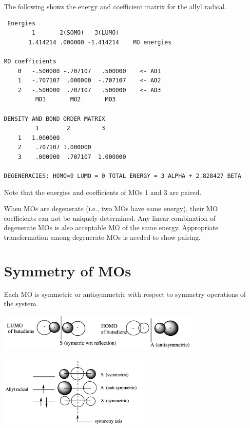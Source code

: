 \documentclass[../Main/chem532-notes.tex]{subfiles}
\begin{document}
\begin{example}
The following shows the energy and coefficient matrix for the allyl radical. 
\begin{verbatim}
 Energies
        1       2(SOMO)   3(LUMO) 
       1.414214 .000000 -1.414214    MO energies

MO coefficients
    0   -.500000 -.707107   .500000    <- AO1
    1   -.707107  .000000  -.707107    <- AO2
    2   -.500000  .707107   .500000    <- AO3
         MO1       MO2       MO3

DENSITY AND BOND ORDER MATRIX
         1        2         3 
    1   1.000000
    2    .707107 1.000000
    3    .000000  .707107  1.000000
         
DEGENERACIES: HOMO=0 LUMO = 0 TOTAL ENERGY = 3 ALPHA + 2.828427 BETA         
\end{verbatim}
Note that the energies and coefficients of MOs 1 and 3 are paired.
\end{example}

When MOs are degenerate (i.e., two MOs have same energy), their MO coefficients can not be uniquely determined.  Any linear combination of degenerate MOs is also acceptable MO of the same energy.  Appropriate transformation among degenerate MOs is needed to show pairing.

\section{Symmetry of MOs}
Each MO is symmetric or antisymmetric with respect to symmetry operations of the system.

\begin{example}
\includegraphics[width=4in]{../huckel/c2_symmetry_ex1.png}
\end{example}

\begin{example}
\includegraphics[width=3in]{../huckel/c2_symmetry_ex2.png}
\end{example}
\end{document}
